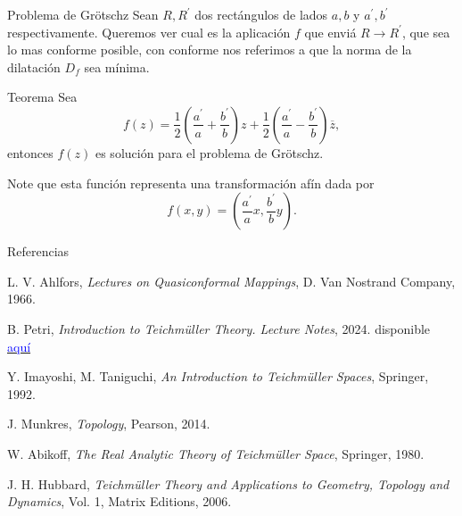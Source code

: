 \documentclass[xcolor=dvipsnames,10pt]{beamer}
\begin{document}
\begin{frame}{Problema de Grötschz}
    Sean $R,R^\prime$ dos rectángulos de lados $a,b$ y $a^\prime,b^\prime$ respectivamente. Queremos ver cual es la aplicación $f$ que enviá $R\to R^\prime$, que sea lo mas conforme posible, con conforme nos referimos a que la norma de la dilatación $D_f$ sea mínima.
    \begin{block}{Teorema}
        Sea 
        $$f(z)=\frac{1}{2}\left(\frac{a^\prime}{a}+\frac{b^\prime}{b}\right)z+\frac{1}{2}\left(\frac{a^\prime}{a}-\frac{b^\prime}{b}\right)\overline{z},$$
        entonces $f(z)$ es solución para el problema de Grötschz.
    \end{block}
    Note que esta función representa una transformación afín dada por 
    $$f(x,y)=\left(\frac{a^\prime}{a}x,\frac{b^\prime}{b}y\right).$$
\end{frame}

\begin{frame}{Referencias}
\begin{thebibliography}{9}

L. V. Ahlfors, \textit{Lectures on Quasiconformal Mappings}, D. Van Nostrand Company, 1966.

B. Petri, \textit{Introduction to Teichmüller Theory. Lecture Notes}, 2024. disponible \href{https://webusers.imj-prg.fr/~bram.petri/teaching_tt_2425.html}{\textcolor{blue}{aquí}}

Y. Imayoshi, M. Taniguchi, \textit{An Introduction to Teichmüller Spaces}, Springer, 1992.

J. Munkres, \textit{Topology}, Pearson, 2014.

W. Abikoff, \textit{The Real Analytic Theory of Teichmüller Space}, Springer, 1980.

J. H. Hubbard, \textit{Teichmüller Theory and Applications to Geometry, Topology and Dynamics}, Vol. 1, Matrix Editions, 2006.


\end{thebibliography}


\end{frame}
\end{document}
